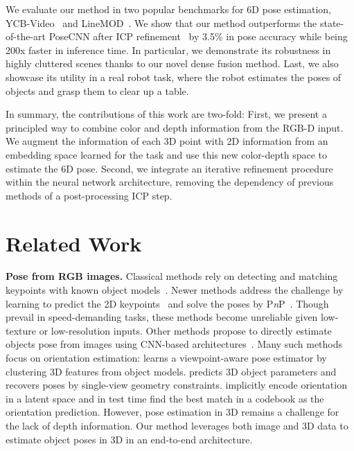 \documentclass[10pt,twocolumn,letterpaper]{article}
\begin{document}
We evaluate our method in two popular benchmarks for 6D pose estimation, YCB-Video~\cite{xiang2017posecnn} and LineMOD~\cite{Hinterstoier2011MultimodalTF}.
We show that our method outperforms the state-of-the-art PoseCNN after ICP refinement~\cite{xiang2017posecnn} by 3.5\% in pose accuracy while being 200x faster in inference time. In particular, we demonstrate its robustness in highly cluttered scenes thanks to our novel dense fusion method. Last, we also showcase its utility in a real robot task, where the robot estimates the poses of objects and grasp them to clear up a table.

In summary, the contributions of this work are two-fold: First, we present a principled way to combine color and depth information from the RGB-D input. We augment the information of each 3D point with 2D information from an embedding space learned for the task and use this new color-depth space to estimate the 6D pose. Second, we integrate an iterative refinement procedure within the neural network architecture, removing the dependency of previous methods of a post-processing ICP step.


\section{Related Work}
\noindent\textbf{Pose from RGB images.} Classical methods rely on detecting and matching keypoints with known object models~\cite{aubry2014seeing, collet2011moped,zhu2014single,rothganger20063d,ferrari2006simultaneous}. Newer methods address the challenge by learning to predict the 2D keypoints~\cite{pavlakos20176,suwajanakorn2018discovery,tremblay2018deep,tekin18,brachmann2014learning} and solve the poses by P\emph{n}P~\cite{fischler1981random}. Though prevail in speed-demanding tasks, these methods become unreliable given low-texture or low-resolution inputs. Other methods propose to directly estimate objects pose from images using CNN-based architectures~\cite{tulsiani2015viewpoints,schwarz2015rgb}. Many such methods focus on orientation estimation: \citet{subcnn,xiang2015data} learns a viewpoint-aware pose estimator by clustering 3D features from object models. \citet{mousavian20163d} predicts 3D object parameters and recovers poses by single-view geometry constraints. \citet{sundermeyer2018implicit} implicitly encode orientation in a latent space and in test time find the best match in a codebook as the orientation prediction. However, pose estimation in 3D remains a challenge for the lack of depth information. Our method leverages both image and 3D data to estimate object poses in 3D in an end-to-end architecture.
\end{document}
